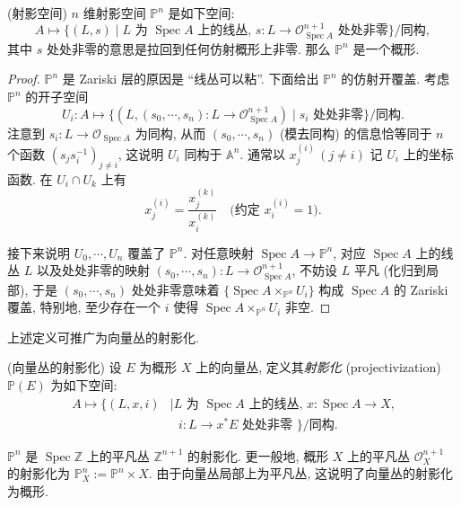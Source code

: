 \documentclass{book}
\begin{document}
	\begin{propdef}
		[label={definition-projective-space}]
		{(射影空间)}
		$n$ 维射影空间 $\mathbb P^n$ 是如下空间:
		$$
		A\mapsto
		\big\{
		(L,s)
		\mid
		\text{$L$ 为 $\operatorname{Spec} A$ 上的线丛,  $s\colon L\to \mathcal O_{\operatorname{Spec} A}^{n+1}$ 处处非零}
		\big\}
		\big/
		\text{同构},
		$$
		其中 $s$ 处处非零的意思是拉回到任何仿射概形上非零. 那么 $\mathbb P^n$ 是一个概形.
	\end{propdef}
	\begin{proof}
		$\mathbb P^n$ 是 Zariski 层的原因是 ``线丛可以粘''. 下面给出 $\mathbb P^n$ 的仿射开覆盖. 考虑 $\mathbb P^n$ 的开子空间
		$$
		U_i\colon A\mapsto \big\{(L,(s_0,\cdots,s_n)\colon L\to\mathcal O_{\operatorname{Spec} A}^{n+1})\mid \text{$s_i$ 处处非零}\big\}\big/\text{同构}.
		$$
		注意到 $s_i\colon L\to\mathcal O_{\operatorname{Spec} A}$ 为同构, 从而 $(s_0,\cdots,s_n)$ (模去同构) 的信息恰等同于 $n$ 个函数 $(s_js_i^{-1})_{j\neq i}$, 这说明 $U_i$ 同构于 $\mathbb A^n$. 通常以 $x_j^{(i)}\,(j\neq i)$ 记 $U_i$ 上的坐标函数. 在 $U_i\cap U_k$ 上有
		$$
		x_j^{(i)} = \frac{x_j^{(k)}}{x_i^{(k)}}\quad \text{(约定 $x_i^{(i)} = 1$)}.
		$$
		
		接下来说明 $U_0,\cdots,U_n$ 覆盖了 $\mathbb P^n$. 对任意映射 $\operatorname{Spec} A \to \mathbb P^n$, 对应 $\operatorname{Spec} A$ 上的线丛 $L$ 以及处处非零的映射 $(s_0,\cdots,s_n)\colon L\to\mathcal O_{\operatorname{Spec} A}^{n+1}$, 不妨设 $L$ 平凡 (化归到局部), 于是 $(s_0,\cdots,s_n)$ 处处非零意味着 $\{\operatorname{Spec} A\times_{\mathbb P^n} U_i\}$ 构成 $\operatorname{Spec} A$ 的 Zariski 覆盖, 特别地, 至少存在一个 $i$ 使得 $\operatorname{Spec} A\times_{\mathbb P^n} U_i$ 非空.
	\end{proof}
	
	上述定义可推广为向量丛的射影化.
	
	\begin{definition}
		{(向量丛的射影化)}
		设 $E$ 为概形 $X$ 上的向量丛, 定义其\emph{射影化} (projectivization) $\mathbb P(E)$ 为如下空间:
		$$
		\begin{aligned}
			A\mapsto \big\{
			(L,x,i)
			&\mid
			\text{$L$ 为 $\operatorname{Spec} A$ 上的线丛,
				$x\colon \operatorname{Spec} A\to X$,}\\
			&\ \ \ 
			\text{$i\colon L\to x^*E$ 处处非零
			}
			\big\}
			\big/\text{同构}.
		\end{aligned}
		$$
	\end{definition}
	
	\begin{example}
		{}
		$\mathbb P^n$ 是 $\operatorname{Spec} \mathbb{Z}$ 上的平凡丛 $\mathbb{Z}^{n+1}$ 的射影化.
		更一般地, 概形 $X$ 上的平凡丛 $\mathcal O_X^{n+1}$ 的射影化为 $\mathbb P^n_X := \mathbb P^n\times X$. 由于向量丛局部上为平凡丛, 这说明了向量丛的射影化为概形.
	\end{example}
	
\end{document}
